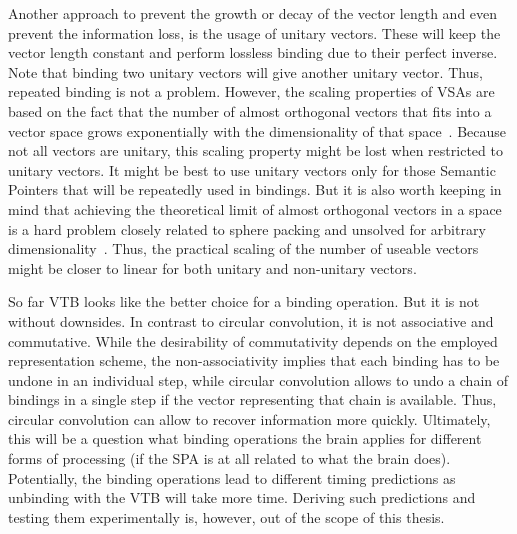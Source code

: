 Another approach to prevent the growth or decay of the vector length and even prevent the information loss, is the usage of unitary vectors.
These will keep the vector length constant and perform lossless binding due to their perfect inverse.
Note that binding two unitary vectors will give another unitary vector.
Thus, repeated binding is not a problem.
However, the scaling properties of VSAs are based on the fact that the number of almost orthogonal vectors that fits into a vector space grows exponentially with the dimensionality of that space~\parencite{wyner1967,cai2013}.
Because not all vectors are unitary, this scaling property might be lost when restricted to unitary vectors.
It might be best to use unitary vectors only for those Semantic Pointers that will be repeatedly used in bindings.
But it is also worth keeping in mind that achieving the theoretical limit of almost orthogonal vectors in a space is a hard problem closely related to sphere packing and unsolved for arbitrary dimensionality~\parencite{cohn2017}.
Thus, the practical scaling of the number of useable vectors might be closer to linear for both unitary and non-unitary vectors.

So far VTB looks like the better choice for a binding operation.
But it is not without downsides.
In contrast to circular convolution, it is not associative and commutative.
While the desirability of commutativity depends on the employed representation scheme, the non-associativity implies that each binding has to be undone in an individual step, while circular convolution allows to undo a chain of bindings in a single step if the vector representing that chain is available.
Thus, circular convolution can allow to recover information more quickly.
Ultimately, this will be a question what binding operations the brain applies for different forms of processing (if the SPA is at all related to what the brain does).
Potentially, the binding operations lead to different timing predictions as unbinding with the VTB will take more time.
Deriving such predictions and testing them experimentally is, however, out of the scope of this thesis.


